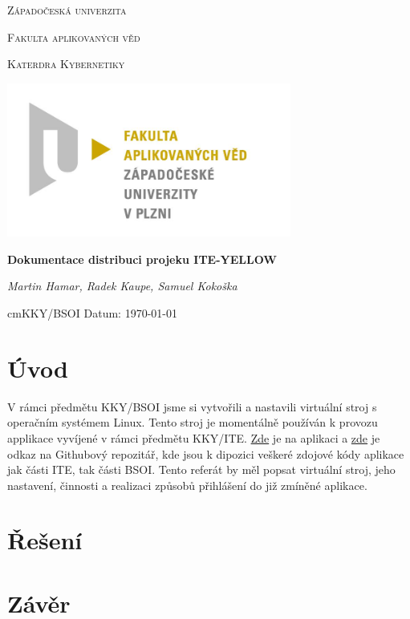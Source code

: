 \documentclass{article}
\begin{document}
\begin{titlepage}

    \centering

    {\scshape\LARGE Západočeská univerzita\par}
    {\scshape\Large Fakulta aplikovaných věd \par}
    {\scshape\Large Katerdra Kybernetiky \par}
    {\begin{center}
            \includegraphics[width=0.7\textwidth]{../pic/fav.jpg}
        \end{center}}

    {\huge\bfseries Dokumentace distribuci projeku ITE-YELLOW\par} %

    \vspace{2cm}

    {\Large\itshape Martin Hamar, Radek Kaupe, Samuel Kokoška\par}

    \vfill

    \vspace{1cm}

     cm{KKY/BSOI} \hfill {Datum: \today }



\end{titlepage}

\section{Úvod}
V rámci předmětu KKY/BSOI jsme si vytvořili a nastavili virtuální stroj s operačním systémem Linux. 
Tento stroj je momentálně používán k provozu applikace vyvíjené v rámci předmětu KKY/ITE. \href{http://147.228.173.162:8881}{Zde} je na aplikaci a \href{https://github.com/RadekKaupe/ITE-Yellow-2024}{zde} je odkaz na Githubový repozitář, kde jsou k dipozici veškeré zdojové kódy aplikace jak části ITE, tak části BSOI. 
Tento referát by měl popsat virtuální stroj, jeho nastavení, činnosti a realizaci způsobů přihlášení do již zmíněné aplikace.   
\section{Řešení}








\section{Závěr}
\end{document}
